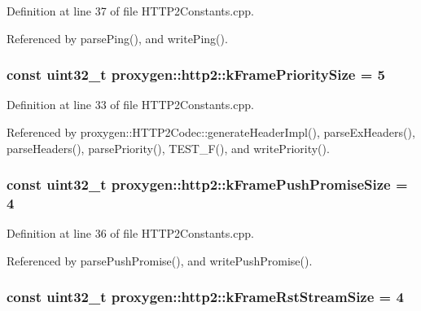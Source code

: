 Definition at line 37 of file H\+T\+T\+P2\+Constants.\+cpp.



Referenced by parse\+Ping(), and write\+Ping().

\subsubsection[{k\+Frame\+Priority\+Size}]{\setlength{\rightskip}{0pt plus 5cm}const uint32\+\_\+t proxygen\+::http2\+::k\+Frame\+Priority\+Size = 5}\label{namespaceproxygen_1_1http2_a2ef2eb006a752f25b63bfb297805631c}


Definition at line 33 of file H\+T\+T\+P2\+Constants.\+cpp.



Referenced by proxygen\+::\+H\+T\+T\+P2\+Codec\+::generate\+Header\+Impl(), parse\+Ex\+Headers(), parse\+Headers(), parse\+Priority(), T\+E\+S\+T\+\_\+\+F(), and write\+Priority().

\subsubsection[{k\+Frame\+Push\+Promise\+Size}]{\setlength{\rightskip}{0pt plus 5cm}const uint32\+\_\+t proxygen\+::http2\+::k\+Frame\+Push\+Promise\+Size = 4}\label{namespaceproxygen_1_1http2_abc4bf174d0d65f45171e3cea0fea3a15}


Definition at line 36 of file H\+T\+T\+P2\+Constants.\+cpp.



Referenced by parse\+Push\+Promise(), and write\+Push\+Promise().

\subsubsection[{k\+Frame\+Rst\+Stream\+Size}]{\setlength{\rightskip}{0pt plus 5cm}const uint32\+\_\+t proxygen\+::http2\+::k\+Frame\+Rst\+Stream\+Size = 4}\label{namespaceproxygen_1_1http2_a1dca88d3417008bfd104fcbf19e83bba}


